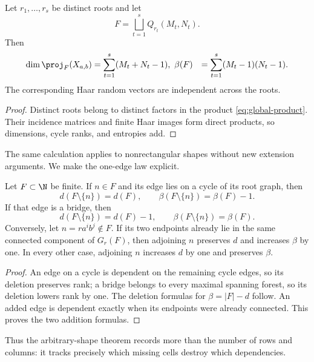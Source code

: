 \begin{corollary}\label{cor:root-rectangles}
Let $r_1,\ldots,r_s$ be distinct roots and let
\[
 F=\bigsqcup_{t=1}^s Q_{r_t}(M_t,N_t).
\]
Then
\begin{align*}
 \dim\proj_F(X_{a,b})
 &=\sum_{t=1}^s(M_t+N_t-1),\
 \beta(F)&=\sum_{t=1}^s(M_t-1)(N_t-1).
\end{align*}
The corresponding Haar random vectors are independent across the roots.
\end{corollary}

\begin{proof}
Distinct roots belong to distinct factors in the product
\eqref{eq:global-product}.  Their incidence matrices and finite Haar images
form direct products, so dimensions, cycle ranks, and entropies add.
\end{proof}

The same calculation applies to nonrectangular shapes without new extension
arguments.  We make the one-edge law explicit.

\begin{corollary}\label{cor:edge-update}
Let $F\subset\N$ be finite.  If $n\in F$ and its edge lies on a cycle of its
root graph, then
\[
 d(F\setminus\{n\})=d(F),\qquad
 \beta(F\setminus\{n\})=\beta(F)-1.
\]
If that edge is a bridge, then
\[
 d(F\setminus\{n\})=d(F)-1,\qquad
 \beta(F\setminus\{n\})=\beta(F).
\]
Conversely, let $n=r a^i b^j\notin F$.  If its two endpoints already lie in
the same connected component of $G_r(F)$, then adjoining $n$ preserves $d$
and increases $\beta$ by one.  In every other case, adjoining $n$ increases
$d$ by one and preserves $\beta$.
\end{corollary}

\begin{proof}
An edge on a cycle is dependent on the remaining cycle edges, so its deletion
preserves rank; a bridge belongs to every maximal spanning forest, so its
deletion lowers rank by one.
The deletion formulas for $\beta=|F|-d$ follow.  An added edge is dependent
exactly when its endpoints were already connected.  This proves the two
addition formulas.
\end{proof}

Thus the arbitrary-shape theorem records more than the number of rows and
columns: it tracks precisely which missing cells destroy which dependencies.

